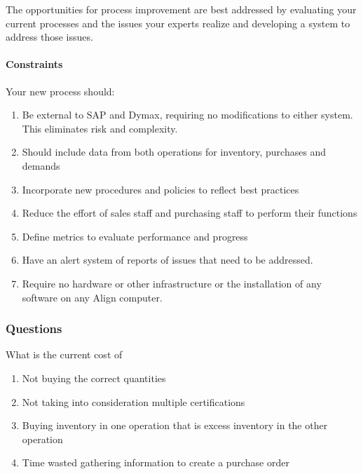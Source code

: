 \documentclass[letterpaper,10pt,english]{sphinxmanual}
\begin{document}
The opportunities for process improvement are best addressed by
evaluating your current processes and the issues your experts realize
and developing a system to address those issues.


\paragraph{Constraints}
\label{\detokenize{FutureState:constraints}}
Your new process should:
\begin{enumerate}
%
\item {} 
Be external to SAP and Dymax, requiring no modifications to either
system. This eliminates risk and complexity.

\item {} 
Should include data from both operations for inventory, purchases and
demands

\item {} 
Incorporate new procedures and policies to reflect best practices

\item {} 
Reduce the effort of sales staff and purchasing staff to perform
their functions

\item {} 
Define metrics to evaluate performance and progress

\item {} 
Have an alert system of reports of issues that need to be addressed.

\item {} 
Require no hardware or other infrastructure or the installation of
any software on any Align computer.

\end{enumerate}


\subsubsection{Questions}
\label{\detokenize{FutureState:id1}}
What is the current cost of
\begin{enumerate}
%
\item {} 
Not buying the correct quantities

\item {} 
Not taking into consideration multiple certifications

\item {} 
Buying inventory in one operation that is excess inventory in the
other operation

\item {} 
Time wasted gathering information to create a purchase order

\end{enumerate}
\end{document}
